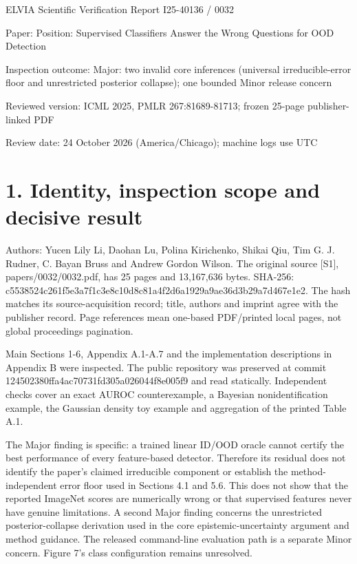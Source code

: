 \documentclass[10pt]{article}
\begin{document}
ELVIA Scientific Verification Report
I25-40136 / 0032\par
Paper: Position: Supervised Classifiers Answer the Wrong Questions for OOD Detection\par
Inspection outcome: Major: two invalid core inferences (universal irreducible-error floor and unrestricted posterior collapse); one bounded Minor release concern\par
Reviewed version: ICML 2025, PMLR 267:81689-81713; frozen 25-page publisher-linked PDF\par
Review date: 24 October 2026 (America/Chicago); machine logs use UTC\par
\section*{1. Identity, inspection scope and decisive result}
Authors: Yucen Lily Li, Daohan Lu, Polina Kirichenko, Shikai Qiu, Tim G. J. Rudner, C. Bayan Bruss and Andrew Gordon Wilson. The original source [S1], papers/0032/0032.pdf, has 25 pages and 13,167,636 bytes. SHA-256: c5538524c261f5e3a7f1c3e8c10d8c81a4f2d6a1929a9ae36d3b29a7d467e1e2. The hash matches its source-acquisition record; title, authors and imprint agree with the publisher record. Page references mean one-based PDF/printed local pages, not global proceedings pagination.\par
Main Sections 1-6, Appendix A.1-A.7 and the implementation descriptions in Appendix B were inspected. The public repository was preserved at commit 124502380ffa4ac70731fd305a026044f8e005f9 and read statically. Independent checks cover an exact AUROC counterexample, a Bayesian nonidentification example, the Gaussian density toy example and aggregation of the printed Table A.1.\par
The Major finding is specific: a trained linear ID/OOD oracle cannot certify the best performance of every feature-based detector. Therefore its residual does not identify the paper’s claimed irreducible component or establish the method-independent error floor used in Sections 4.1 and 5.6. This does not show that the reported ImageNet scores are numerically wrong or that supervised features never have genuine limitations. A second Major finding concerns the unrestricted posterior-collapse derivation used in the core epistemic-uncertainty argument and method guidance. The released command-line evaluation path is a separate Minor concern. Figure 7’s class configuration remains unresolved.\par
\end{document}
